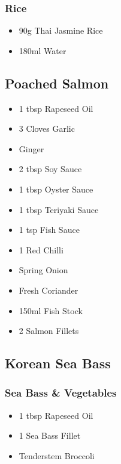 \documentclass[11pt, english]{article}
\begin{document}
		\subsubsection*{Rice}

	\begin{itemize}
        \setlength\itemsep{0cm}
                \item 90g Thai Jasmine Rice
		\item 180ml Water
        \end{itemize}

\newpage

	\subsection{Poached Salmon}

	\begin{itemize}
        \setlength\itemsep{0cm}
                \item 1 tbsp Rapeseed Oil
		\item 3 Cloves Garlic
		\item Ginger
		\item 2 tbsp Soy Sauce
		\item 1 tbsp Oyster Sauce
		\item 1 tbsp Teriyaki Sauce
		\item 1 tsp Fish Sauce
		\item 1 Red Chilli
		\item Spring Onion
		\item Fresh Coriander
		\item 150ml Fish Stock
		\item 2 Salmon Fillets
        \end{itemize}

\newpage

	\subsection{Korean Sea Bass}

		\subsubsection*{Sea Bass \& Vegetables}
	
	\begin{itemize}
        \setlength\itemsep{0cm}
                \item 1 tbsp Rapeseed Oil
		\item 1 Sea Bass Fillet
		\item Tenderstem Broccoli
        \end{itemize}
\end{document}
